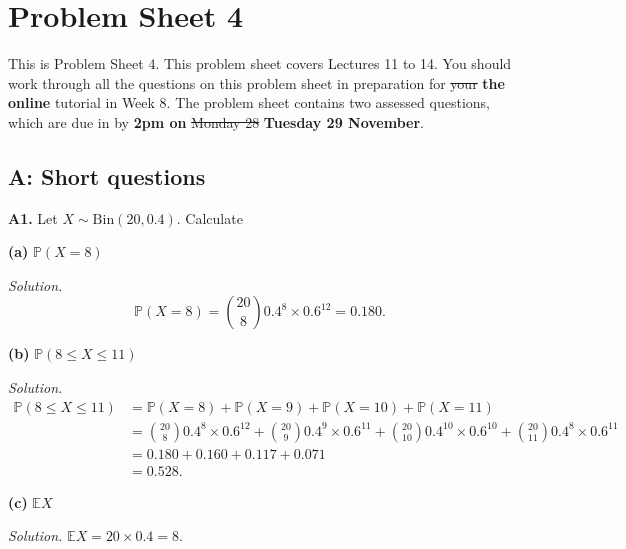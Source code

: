 \documentclass[
  a4paper,
]{book}
\newif\ifcomm\commtrue
\theoremstyle{definition}
\theoremstyle{definition}
\theoremstyle{definition}
\theoremstyle{definition}
\theoremstyle{remark}
\begin{document}
\hypertarget{P4}{%
\chapter*{Problem Sheet 4}\label{P4}}

\commfalse

This is Problem Sheet 4. This problem sheet covers Lectures 11 to 14. You should work through all the questions on this problem sheet in preparation for \sout{your} \textbf{the online} tutorial in Week 8. The problem sheet contains two assessed questions, which are due in by \textbf{2pm on} \sout{Monday 28} \textbf{Tuesday 29 November}.

\hypertarget{P4-short}{%
\section*{A: Short questions}\label{P4-short}}

\textbf{A1.} Let \(X \sim \text{Bin}(20, 0.4)\). Calculate

\textbf{(a)} \(\mathbb P(X = 8)\)

\begin{myanswers}
\emph{Solution.}
\[ \mathbb P(X = 8) = \binom{20}{8} 0.4^8 \times 0.6^{12} = 0.180 . \]

\end{myanswers}

\textbf{(b)} \(\mathbb P(8 \leq X \leq 11)\)

\begin{myanswers}
\emph{Solution.}
\begin{align*}
\mathbb P(8 \leq X \leq 11) &= \mathbb P(X = 8) + \mathbb P(X = 9) + \mathbb P(X = 10) + \mathbb P(X = 11) \\ 
&= \binom{20}{8} 0.4^8 \times 0.6^{12} + \binom{20}{9} 0.4^9 \times 0.6^{11} + \binom{20}{10} 0.4^10 \times 0.6^{10} + \binom{20}{11} 0.4^8 \times 0.6^{11} \\
&= 0.180 + 0.160 + 0.117 + 0.071 \\
&= 0.528 .
\end{align*}

\end{myanswers}

\textbf{(c)} \(\mathbb EX\)

\begin{myanswers}
\emph{Solution.} \(\mathbb EX = 20 \times 0.4 = 8\).

\end{myanswers}
\end{document}
